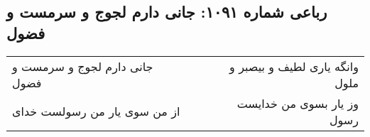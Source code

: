 \begin{center}
\section*{رباعی شماره ۱۰۹۱: جانی دارم لجوج و سرمست و فضول}
\label{sec:1091}
\begin{longtable}{l p{0.5cm} r}
جانی دارم لجوج و سرمست و فضول
&&
وانگه یاری لطیف و بیصبر و ملول
\\
از من سوی یار من رسولست خدای
&&
وز یار بسوی من خدایست رسول
\\
\end{longtable}
\end{center}

